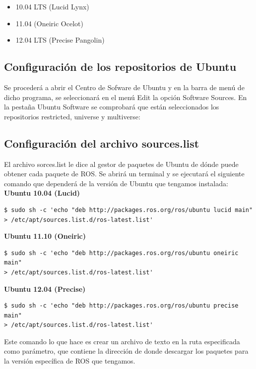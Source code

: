\documentclass[10pt, a4paper]{report}
\begin{document}
\begin{itemize}
\item 10.04 LTS (Lucid Lynx)
\item 11.04 (Oneiric Ocelot)
\item 12.04 LTS (Precise Pangolin)
\end{itemize}

\subsection{Configuración de los repositorios de Ubuntu}

Se procederá a abrir el Centro de Sofware de Ubuntu y en la barra de menú de dicho programa, se seleccionará en el menú Edit la opción Software Sources. En la pestaña Ubuntu Software se comprobará que están seleccionados los repositorios restricted, universe y multiverse:\\


\subsection{Configuración del archivo sources.list}

El archivo sorces.list le dice al gestor de paquetes de Ubuntu de dónde puede obtener cada paquete de ROS.
Se abrirá un terminal y se ejecutará el siguiente comando que dependerá de la versión de Ubuntu que tengamos instalada:\\

\textbf{Ubuntu 10.04 (Lucid)}
\begin{verbatim}
$ sudo sh -c 'echo "deb http://packages.ros.org/ros/ubuntu lucid main" 
> /etc/apt/sources.list.d/ros-latest.list'
\end{verbatim}

\textbf{Ubuntu 11.10 (Oneiric)}
\begin{verbatim}
$ sudo sh -c 'echo "deb http://packages.ros.org/ros/ubuntu oneiric main" 
> /etc/apt/sources.list.d/ros-latest.list'
\end{verbatim}

\textbf{Ubuntu 12.04 (Precise)}
\begin{verbatim}
$ sudo sh -c 'echo "deb http://packages.ros.org/ros/ubuntu precise main" 
> /etc/apt/sources.list.d/ros-latest.list'
\end{verbatim}

Este comando lo que hace es crear un archivo de texto en la ruta especificada como parámetro, que contiene la dirección de donde descargar los paquetes para la versión específica de ROS que tengamos.
\end{document}
